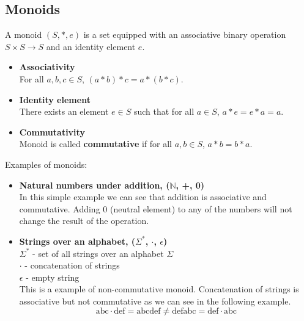 \documentclass{article}
\begin{document}
\subsection{Monoids}
A monoid \( (S, \ast, e) \) is a set equipped with an associative binary operation \( S \times S \to S \) and
an identity element \(e\). 
\begin{itemize}
    \item \textbf{Associativity} \\
    For all \( a, b, c \in S \), \( (a \ast b) \ast c = a \ast (b \ast c) \).
    \item \textbf{Identity element} \\
    There exists an element \( e \in S \) such that for all \( a \in S \), \( a \ast e = e \ast a = a \).
    \item \textbf{Commutativity} \\
    Monoid is called \textbf{commutative} if for all \( a, b \in S \), \( a \ast b = b \ast a \).
\end{itemize}
Examples of monoids:
\begin{itemize}
    \item \textbf{Natural numbers under addition, (\(\mathbb{N}\), +, 0) } \\
    In this simple example we can see that addition is associative and commutative. 
    Adding 0 (neutral element) to any of the numbers will not change the result of the operation.
    \item \textbf{Strings over an alphabet, (\(\Sigma^*\), \(\cdot\), \(\epsilon\))} \\
    \(\Sigma^*\) - set of all strings over an alphabet \(\Sigma\) \\
    \(\cdot\) - concatenation of strings \\
    \(\epsilon\) - empty string \\
    This is a example of non-commutative monoid. Concatenation of strings is associative but not commutative as we can see in the following example.
    \begin{equation}
        \text{abc} \cdot \text{def} = \text{abcdef} \neq \text{defabc} = \text{def} \cdot \text{abc}
    \end{equation}
\end{itemize}
\end{document}
